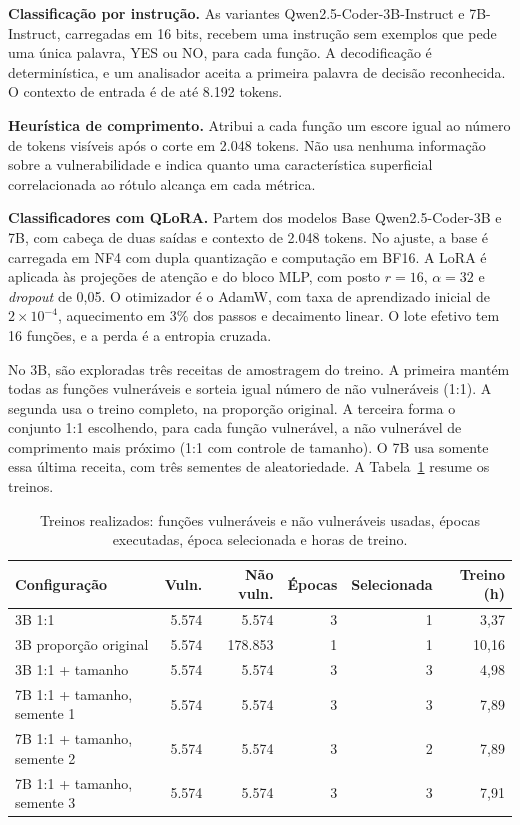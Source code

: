 \begin{alineas}
    \item \textbf{Classificação por instrução.} As variantes Qwen2.5-Coder-3B-Instruct e 7B-Instruct, carregadas em 16 bits, recebem uma instrução sem exemplos que pede uma única palavra, YES ou NO, para cada função. A decodificação é determinística, e um analisador aceita a primeira palavra de decisão reconhecida. O contexto de entrada é de até 8.192 tokens.
    \item \textbf{Heurística de comprimento.} Atribui a cada função um escore igual ao número de tokens visíveis após o corte em 2.048 tokens. Não usa nenhuma informação sobre a vulnerabilidade e indica quanto uma característica superficial correlacionada ao rótulo alcança em cada métrica.
    \item \textbf{Classificadores com QLoRA.} Partem dos modelos Base Qwen2.5-Coder-3B e 7B, com cabeça de duas saídas e contexto de 2.048 tokens. No ajuste, a base é carregada em NF4 com dupla quantização e computação em BF16. A LoRA é aplicada às projeções de atenção e do bloco MLP, com posto $r = 16$, $\alpha = 32$ e \textit{dropout} de 0,05. O otimizador é o AdamW, com taxa de aprendizado inicial de $2 \times 10^{-4}$, aquecimento em 3\% dos passos e decaimento linear. O lote efetivo tem 16 funções, e a perda é a entropia cruzada.
\end{alineas}

No 3B, são exploradas três receitas de amostragem do treino. A primeira mantém todas as funções vulneráveis e sorteia igual número de não vulneráveis (1:1). A segunda usa o treino completo, na proporção original. A terceira forma o conjunto 1:1 escolhendo, para cada função vulnerável, a não vulnerável de comprimento mais próximo (1:1 com controle de tamanho). O 7B usa somente essa última receita, com três sementes de aleatoriedade. A Tabela~\ref{tab:treinos} resume os treinos.

\begin{table}[H]
    \centering
    \caption{Treinos realizados: funções vulneráveis e não vulneráveis usadas, épocas executadas, época selecionada e horas de treino.}
    \label{tab:treinos}
    \footnotesize
    \begin{tabular}{lrrrrr}
        \toprule
        \textbf{Configuração} & \textbf{Vuln.} & \textbf{Não vuln.} & \textbf{Épocas} & \textbf{Selecionada} & \textbf{Treino (h)} \\
        \midrule
        3B 1:1 & 5.574 & 5.574 & 3 & 1 & 3,37 \\
        3B proporção original & 5.574 & 178.853 & 1 & 1 & 10,16 \\
        3B 1:1 + tamanho & 5.574 & 5.574 & 3 & 3 & 4,98 \\
        7B 1:1 + tamanho, semente 1 & 5.574 & 5.574 & 3 & 3 & 7,89 \\
        7B 1:1 + tamanho, semente 2 & 5.574 & 5.574 & 3 & 2 & 7,89 \\
        7B 1:1 + tamanho, semente 3 & 5.574 & 5.574 & 3 & 3 & 7,91 \\
        \bottomrule
    \end{tabular}
\end{table}


